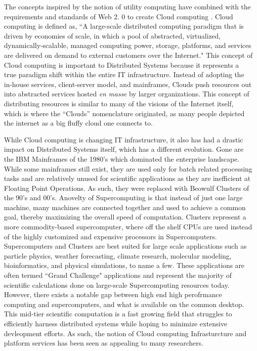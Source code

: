 The concepts inspired by the notion of utility computing have combined with the requirements and standards of Web 2. 0 \cite{alexander2006wnw} to create Cloud computing \cite{buyya2008moc, foster2008cca, aboveTheClouds}.  Cloud computing is defined as, ``A large-scale distributed computing paradigm that is driven by economies of scale, in which a pool of abstracted, virtualized, dynamically-scalable, managed computing power, storage, platforms, and services are delivered on demand to external customers over the Internet." This concept of Cloud computing is important to Distributed Systems because it represents a true paradigm shift \cite{kuhn1970structure} within the entire IT infrastructure.  Instead of adopting the in-house services, client-server model, and mainframes, Clouds push resources out into abstracted services hosted \textit{en masse} by larger organizations.  This concept of distributing resources is similar to many of the visions of the Internet itself, which is where the ``Clouds'' nomenclature originated, as many people depicted the internet as a big fluffy cloud one connects to.

While Cloud computing is changing IT infrastructure, it also has had a drastic impact on Distributed Systems itself, which has a different evolution. Gone are the IBM Mainframes of the 1980's which dominated the enterprise landscape.  While some mainframes still exist, they are used only for batch related processing tasks and are relatively unused for scientific applications as they are inefficient at Floating Point Operations.  As such, they were replaced with Beowulf Clusters \cite{sterling2001beowulf} of the 90's and 00's. Anovelty of Supercomputing is that instead of just one large machine, many machines are connected together and used to achieve a common goal, thereby maximizing the overall speed of computation.  Clusters represent a more commodity-based supercomputer, where off the shelf CPUs are used instead of the highly customized and expensive processors in Supercomputers.  Supercomputers and Clusters are best suited for large scale applications such as particle physics, weather forecasting, climate research, molecular  modeling, bioinformatics, and physical simulations, to name a few.  These applications are often termed ``Grand Challenge" applications and represent the majority of scientific calculations done on large-scale Supercomputing resources today. However, there exists a notable gap between high end high perofrmance computing and supercomputers, and what is available on the common desktop. This mid-tier scientific computation is a fast growing field that struggles to efficiently harness distributed systems while hoping to minimize extensive devleopment efforts. As such, the notion of Cloud computing Infrasturcture and platform services has been seen as appealing to many researchers.  

